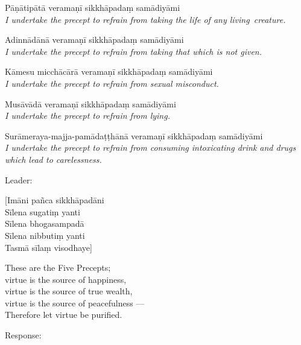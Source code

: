 \ifhandbookedition
\enlargethispage{-\baselineskip}
\fi

{\raggedright

\begin{packedenumerate}
  \item Pāṇātipātā veramaṇī sikkhāpadaṃ samādiyāmi\\
    \emph{I undertake the precept to refrain from taking the life of any living~creature.}
  \item Adinnādānā veramaṇī sikkhāpadaṃ samādiyāmi\\
    \emph{I undertake the precept to refrain from taking that which is not given.}
  \item Kāmesu micchācārā veramaṇī sikkhāpadaṃ samādiyāmi\\
    \emph{I undertake the precept to refrain from sexual misconduct.}
  \item Musāvādā veramaṇī sikkhāpadaṃ samādiyāmi\\
    \emph{I undertake the precept to refrain from lying.}
  \item Surāmeraya-majja-pamādaṭṭhānā veramaṇī sikkhāpadaṃ samādiyāmi\\
    \emph{I undertake the precept to refrain from consuming intoxicating drink and drugs which lead to carelessness.}
\end{packedenumerate}

}

\begin{instruction}
  Leader:
\end{instruction}

[Imāni pañca sikkhāpadāni\\
Sīlena sugatiṃ yanti\\
Sīlena bhogasampadā\\
Sīlena nibbutiṃ yanti\\
Tasmā sīlaṃ visodhaye]

\begin{english}
  These are the Five Precepts;\\
  virtue is the source of happiness,\\
  virtue is the source of true wealth,\\
  virtue is the source of peacefulness ---\\
  Therefore let virtue be purified.
\end{english}

\begin{instruction}
  Response:
\end{instruction}

